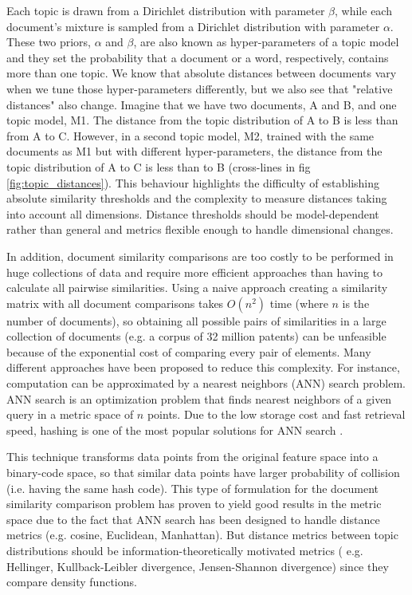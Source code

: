 Each topic is drawn from a Dirichlet distribution with parameter $\beta$, while each document's mixture is sampled from a Dirichlet distribution with parameter $\alpha$. These two priors, $\alpha$ and $\beta$, are also known as hyper-parameters of a topic model and they set the probability that a document or a word, respectively, contains more than one topic. We know that absolute distances between documents vary when we tune those hyper-parameters differently, but we also see that "relative distances" also change. Imagine that we have two documents, A and B, and one topic model, M1. The distance from the topic distribution of A to B is less than from A to C. However, in a second topic model, M2, trained with the same documents as M1 but with different hyper-parameters, the distance from the topic distribution of A to C is less than to B (cross-lines in fig \ref{fig:topic_distances}). This behaviour highlights the difficulty of establishing absolute similarity thresholds and the complexity to measure distances taking into account all dimensions. Distance thresholds should be model-dependent rather than general and metrics flexible enough to handle dimensional changes. 

In addition, document similarity comparisons are too costly to be performed in huge collections of data and require more efficient approaches than having to calculate all pairwise similarities. Using a naive approach creating a similarity matrix with all document comparisons takes $O(n^2)$ time (where $n$ is the number of documents), so obtaining all possible pairs of similarities in a large collection of documents (e.g. a corpus of 32 million patents) can be unfeasible because of the exponential cost of comparing every pair of elements. Many different approaches have been proposed to reduce this complexity. For instance, computation can be approximated by a nearest neighbors (ANN) search problem. ANN search is an optimization problem that finds nearest neighbors of a given query in a metric space of $n$ points. Due to the low storage cost and fast retrieval speed, hashing is one of the most popular solutions for ANN search \citep{Zhen2016}. 

This technique transforms data points from the original feature space into a binary-code space, so that similar data points have larger probability of collision (i.e. having the same hash code). This type of formulation for the document similarity comparison problem has proven to yield good results in the metric space \citep{Krstovski2011} due to the fact that ANN search has been designed to handle distance metrics (e.g. cosine, Euclidean, Manhattan). But distance metrics between topic distributions should be information-theoretically motivated metrics ( e.g. Hellinger, Kullback-Leibler divergence, Jensen-Shannon divergence) since they compare density functions. 


